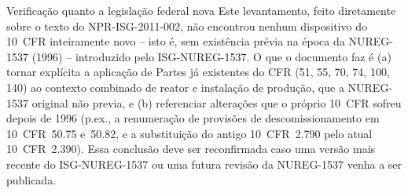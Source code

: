 \pagebreak
\begin{notaregulatoria}{Verifica\c{c}\~ao quanto a legisla\c{c}\~ao federal nova}
Este levantamento, feito diretamente sobre o texto do NPR-ISG-2011-002,
n\~ao encontrou nenhum dispositivo do 10~CFR inteiramente novo -- isto \'e,
sem exist\^encia pr\'evia na \'epoca da NUREG-1537 (1996) -- introduzido
pelo ISG-NUREG-1537. O que o documento faz \'e (a) tornar expl\'icita a
aplica\c{c}\~ao de Partes j\'a existentes do CFR (51, 55, 70, 74, 100, 140)
ao contexto combinado de reator e instala\c{c}\~ao de produ\c{c}\~ao, que a
NUREG-1537 original n\~ao previa, e (b) referenciar altera\c{c}\~oes que o
pr\'oprio 10~CFR sofreu depois de 1996 (p.ex., a renumera\c{c}\~ao de
provis\~oes de descomissionamento em 10~CFR~50.75 e~50.82, e a
substitui\c{c}\~ao do antigo 10~CFR~2.790 pelo atual 10~CFR~2.390). Essa
conclus\~ao deve ser reconfirmada caso uma vers\~ao mais recente do
ISG-NUREG-1537 ou uma futura revis\~ao da NUREG-1537 venha a ser publicada.
\end{notaregulatoria}
